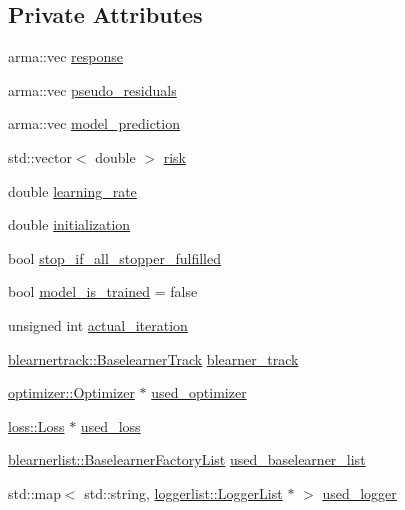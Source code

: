 \subsection*{Private Attributes}
\begin{DoxyCompactItemize}
\item 
arma\+::vec \hyperlink{classcboost_1_1_compboost_a01de924b977c9ba12a3f3be88e2586e4}{response}
\item 
arma\+::vec \hyperlink{classcboost_1_1_compboost_acb8716c9e383e15ae7d8785a591860f7}{pseudo\+\_\+residuals}
\item 
arma\+::vec \hyperlink{classcboost_1_1_compboost_a7f7c7fe26c16c175e7d402aca781e8da}{model\+\_\+prediction}
\item 
std\+::vector$<$ double $>$ \hyperlink{classcboost_1_1_compboost_ab6ccd78f33c6843990bdc9e6c7f72518}{risk}
\item 
double \hyperlink{classcboost_1_1_compboost_aa6a7b77188ae60be668e87018d28835a}{learning\+\_\+rate}
\item 
double \hyperlink{classcboost_1_1_compboost_a2056c4035d5e0d8b0dcb4daedfadee16}{initialization}
\item 
bool \hyperlink{classcboost_1_1_compboost_a40c118dcaf96479cd6574138f9b2620f}{stop\+\_\+if\+\_\+all\+\_\+stopper\+\_\+fulfilled}
\item 
bool \hyperlink{classcboost_1_1_compboost_af1da66c1def3edd484f5d30b36e64eeb}{model\+\_\+is\+\_\+trained} = false
\item 
unsigned int \hyperlink{classcboost_1_1_compboost_a3db81c285c1cd238d0fb65dfc6c00439}{actual\+\_\+iteration}
\item 
\hyperlink{classblearnertrack_1_1_baselearner_track}{blearnertrack\+::\+Baselearner\+Track} \hyperlink{classcboost_1_1_compboost_af9c2787818f591941f74af0059ca7dc9}{blearner\+\_\+track}
\item 
\hyperlink{classoptimizer_1_1_optimizer}{optimizer\+::\+Optimizer} $\ast$ \hyperlink{classcboost_1_1_compboost_a6c0311a05cf6128b4c76fabbc432b807}{used\+\_\+optimizer}
\item 
\hyperlink{classloss_1_1_loss}{loss\+::\+Loss} $\ast$ \hyperlink{classcboost_1_1_compboost_a9c776faf5e9b9e99b5241f2a650d5242}{used\+\_\+loss}
\item 
\hyperlink{classblearnerlist_1_1_baselearner_factory_list}{blearnerlist\+::\+Baselearner\+Factory\+List} \hyperlink{classcboost_1_1_compboost_ac4c690473dc39e10e84ae9d9219b1fa1}{used\+\_\+baselearner\+\_\+list}
\item 
std\+::map$<$ std\+::string, \hyperlink{classloggerlist_1_1_logger_list}{loggerlist\+::\+Logger\+List} $\ast$ $>$ \hyperlink{classcboost_1_1_compboost_a05590928bf741eecb135f32da339ceaa}{used\+\_\+logger}
\end{DoxyCompactItemize}


